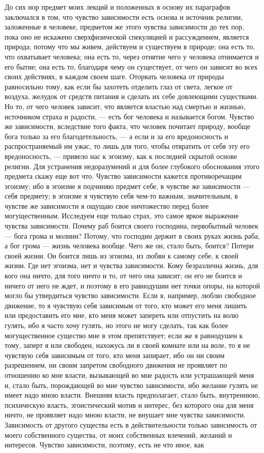 \documentclass[12pt]{article}
\begin{document}
До сих нор предмет моих лекций и положенных в основу их параграфов заключался в том, что чувство зависимости есть основа и источник религии, заложенные в человеке, предметом же этого чувства зависимости до тех пор, пока оно не искажено сверхфизической спекуляцией и рассуждением, является природа; потому что мы живем, действуем и существуем в природе; она есть то, что охватывает человека; она есть то, через отнятие чего у человека отнимается и его бытие; она есть то, благодаря чему он существует, от чего он зависит во всех своих действиях, в каждом своем шаге. Оторвать человека от природы равносильно тому, как если бы захотеть отделить глаз от света, легкое от воздуха, желудок от средств питания и сделать их себе довлеющими существами. Но то, от чего человек зависит, что является властью над смертью и жизнью, источником страха и радости, --- есть бог человека и называется богом. Чувство же зависимости, вследствие того факта, что человек почитает природу, вообще бога только за его благодетельность, --- а если и за его вредоносность и распространяемый им ужас, то лишь для того, чтобы отвратить от себя эту его вредоносность, --- привело нас к эгоизму, как к последней скрытой основе религии. Для устранения недоразумений и для более глубокого обоснования этого предмета скажу еще вот что. Чувство зависимости кажется противоречащим эгоизму; ибо в эгоизме я подчиняю предмет себе, в чувстве же зависимости --- себя предмету; в эгоизме я чувствую себя чем-то важным, значительным, в чувстве же зависимости я ощущаю свое ничтожество перед более могущественным. Исследуем еще только страх, это самое яркое выражение чувства зависимости. Почему раб боится своего господина, первобытный человек --- бога грома и молнии? Потому, что господин держит в своих руках жизнь раба, а бог грома --- жизнь человека вообще. Чего же он, стало быть, боится? Потери своей жизни. Он боится лишь из эгоизма, из любви к самому себе, к своей жизни. Где нет эгоизма, нет и чувства зависимости. Кому безразлична жизнь, для кого она ничто, для того ничто и то, от чего она зависит; он его не боится и ничего от него не ждет, и поэтому в его равнодушии нет точки опоры, на которой могло бы утвердиться чувство зависимости. Если я, например, люблю свободное движение, то я чувствую себя зависимым от того, кто может его меня лишить или предоставить его мне, кто меня может запереть или отпустить на волю гулять, ибо я часто хочу гулять, но этого не могу сделать, так как более могущественное существо мне в этом препятствует; если же я равнодушен к тому, заперт я или свободен, нахожусь ли в своей комнате или на воле, то я не чувствую себя зависимым от того, кто меня запирает, ибо он ни своим разрешением, ни своим запретом свободного движения не проявляет по отношению ко мне власти, вызывающей во мне радость или устрашающей меня и, стало быть, порождающей во мне чувство зависимости, ибо желание гулять не имеет надо мною власти. Внешняя власть предполагает, стало быть, внутреннюю, психическую власть, эгоистический мотив и интерес, без которого она для меня ничто, не проявляет надо мною власти, не внушает мне чувства зависимости. Зависимость от другого существа есть в действительности только зависимость от моего собственного существа, от моих собственных влечений, желаний и интересов. Чувство зависимости, поэтому, есть не что иное, как 
\end{document}
